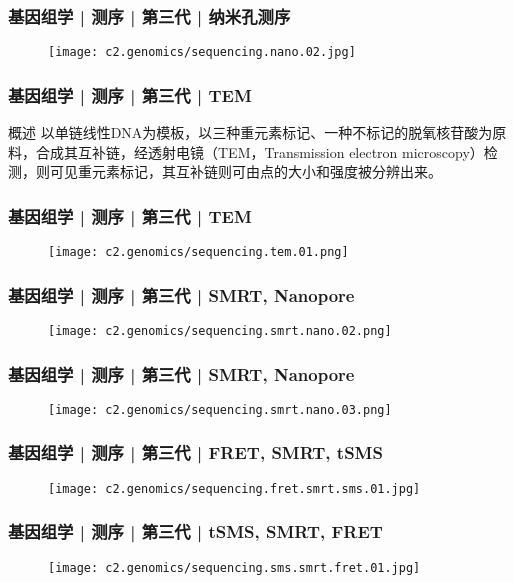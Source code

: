 \begin{frame}
  \frametitle{基因组学 | 测序 | 第三代 | 纳米孔测序}
  \begin{figure}
    \centering
    \texttt{[image: c2.genomics/sequencing.nano.02.jpg]}
  \end{figure}
\end{frame}

\begin{frame}
  \frametitle{基因组学 | 测序 | 第三代 | TEM}
  \begin{block}{概述}
以单链线性DNA为模板，以三种重元素标记、一种不标记的脱氧核苷酸为原料，合成其互补链，经透射电镜（TEM，Transmission electron microscopy）检测，则可见重元素标记，其互补链则可由点的大小和强度被分辨出来。
  \end{block}
\end{frame}

\begin{frame}
  \frametitle{基因组学 | 测序 | 第三代 | TEM}
  \begin{figure}
    \centering
    \texttt{[image: c2.genomics/sequencing.tem.01.png]}
  \end{figure}
\end{frame}

\begin{frame}
  \frametitle{基因组学 | 测序 | 第三代 | SMRT, Nanopore}
  \begin{figure}
    \centering
    \texttt{[image: c2.genomics/sequencing.smrt.nano.02.png]}
  \end{figure}
\end{frame}

\begin{frame}
  \frametitle{基因组学 | 测序 | 第三代 | SMRT, Nanopore}
  \begin{figure}
    \centering
    \texttt{[image: c2.genomics/sequencing.smrt.nano.03.png]}
  \end{figure}
\end{frame}

\begin{frame}
  \frametitle{基因组学 | 测序 | 第三代 | FRET, SMRT, tSMS}
  \begin{figure}
    \centering
    \texttt{[image: c2.genomics/sequencing.fret.smrt.sms.01.jpg]}
  \end{figure}
\end{frame}

\begin{frame}
  \frametitle{基因组学 | 测序 | 第三代 | tSMS, SMRT, FRET}
  \begin{figure}
    \centering
    \texttt{[image: c2.genomics/sequencing.sms.smrt.fret.01.jpg]}
  \end{figure}
\end{frame}

